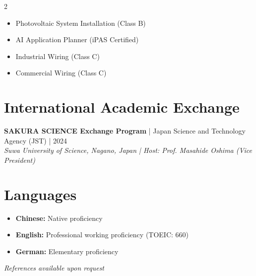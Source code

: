 \documentclass[11pt,a4paper]{article}
\begin{document}
\begin{multicols}{2}
\begin{itemize}[leftmargin=*, itemsep=2pt]
    \item Photovoltaic System Installation (Class B)
    \item AI Application Planner (iPAS Certified)
    \item Industrial Wiring (Class C)
    \item Commercial Wiring (Class C)
\end{itemize}
\end{multicols}

\section{International Academic Exchange}
\vspace{2pt}

\textbf{SAKURA SCIENCE Exchange Program} | Japan Science and Technology Agency (JST) | 2024\\
\textit{Suwa University of Science, Nagano, Japan | Host: Prof. Masahide Oshima (Vice President)}

\section{Languages}
\vspace{2pt}

\begin{itemize}[leftmargin=*, itemsep=1pt]
    \item \textbf{Chinese:} Native proficiency
    \item \textbf{English:} Professional working proficiency (TOEIC: 660)
    \item \textbf{German:} Elementary proficiency
\end{itemize}

\vspace{8pt}

\begin{center}
\textit{\small References available upon request}
\end{center}
\end{document}
